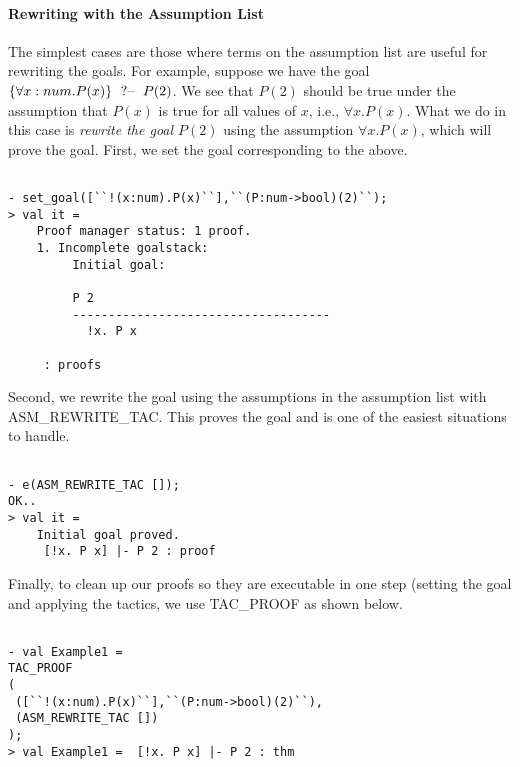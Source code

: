 \paragraph*{Rewriting with the Assumption List}

The simplest cases are those where terms on the assumption list are
useful for rewriting the goals.  For example, suppose we have the goal
$\{\forall x:num.P(x)\}\;\text{ ?-- }\;{P(2)}$. We see that $P(2)$ should be true
under the assumption that $P(x)$ is true for all values of $x$, i.e.,
$\forall x.P(x)$.  What we do in this case is \emph{rewrite the goal
  $P(2)$} using the assumption $\forall x.P(x)$, which will prove the
goal. First, we set the goal corresponding to the above.
\begin{session}
  \begin{scriptsize}
\begin{verbatim}

- set_goal([``!(x:num).P(x)``],``(P:num->bool)(2)``);
> val it =
    Proof manager status: 1 proof.
    1. Incomplete goalstack:
         Initial goal:
         
         P 2
         ------------------------------------
           !x. P x
         
     : proofs
\end{verbatim}
  \end{scriptsize}
\end{session}

Second, we rewrite the goal using the assumptions in the assumption
list with ASM\_REWRITE\_TAC. This proves the goal and is one of the
easiest situations to handle.
\begin{session}
  \begin{scriptsize}
\begin{verbatim}

- e(ASM_REWRITE_TAC []);
OK..
> val it =
    Initial goal proved.
     [!x. P x] |- P 2 : proof
\end{verbatim}
  \end{scriptsize}
\end{session}
Finally, to clean up our proofs so they are executable in one step
(setting the goal and applying the tactics, we use TAC\_PROOF as shown
below.
\begin{session}
  \begin{scriptsize}
\begin{verbatim}

- val Example1 =
TAC_PROOF
(
 ([``!(x:num).P(x)``],``(P:num->bool)(2)``),
 (ASM_REWRITE_TAC [])
);
> val Example1 =  [!x. P x] |- P 2 : thm
\end{verbatim}
  \end{scriptsize}
\end{session}
